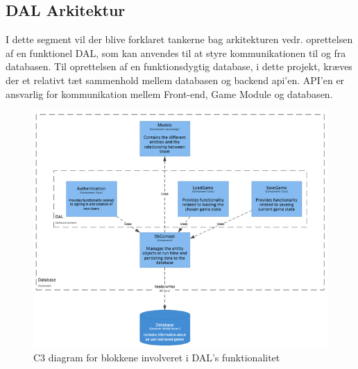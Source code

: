 \subsection{DAL Arkitektur}
I dette segment vil der blive forklaret tankerne bag arkitekturen vedr. oprettelsen af en funktionel DAL, som kan anvendes til at styre kommunikationen til og fra databasen.
Til oprettelsen af en funktionsdygtig database, i dette projekt, kræves der et relativt tæt sammenhold mellem databasen og backend api’en. API’en er ansvarlig for kommunikation mellem Front-end, Game Module og databasen.

\begin{figure}[H]
\centering
\includegraphics[width = \textwidth]{02-Body/Images/DALArkitektur}
\caption{C3 diagram for blokkene involveret i DAL's funktionalitet}

\label{fig:DALArkitektur}
\end{figure}


